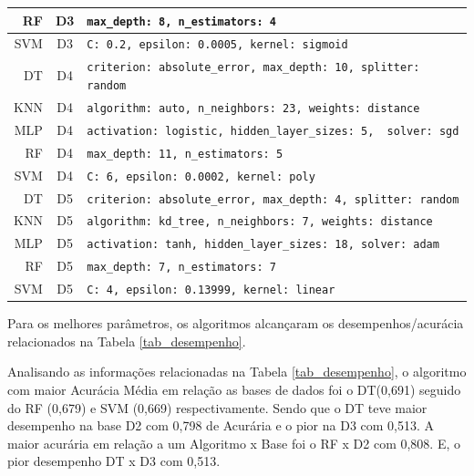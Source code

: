\documentclass[12pt]{article}
\begin{document}
\begin{table}[h!]
\begin{center}
\begin{tabular}{r|c|l}
      RF                  & D3                     & \scriptsize{\verb=max_depth: 8, n_estimators: 4=} \\ \hline
      SVM                 & D3                     & \scriptsize{\verb=C: 0.2, epsilon: 0.0005, kernel: sigmoid=} \\ \hline
      DT                  & D4                     & \scriptsize{\verb=criterion: absolute_error, max_depth: 10, splitter: random=} \\ \hline
      KNN                 & D4                     & \scriptsize{\verb=algorithm: auto, n_neighbors: 23, weights: distance=} \\ \hline
      MLP                 & D4                     & \scriptsize{\verb=activation: logistic, hidden_layer_sizes: 5,  solver: sgd=} \\ \hline
      RF                  & D4                     & \scriptsize{\verb=max_depth: 11, n_estimators: 5=} \\ \hline
      SVM                 & D4                     & \scriptsize{\verb=C: 6, epsilon: 0.0002, kernel: poly=} \\ \hline
      DT                  & D5                     & \scriptsize{\verb=criterion: absolute_error, max_depth: 4, splitter: random=} \\ \hline
      KNN                 & D5                     & \scriptsize{\verb=algorithm: kd_tree, n_neighbors: 7, weights: distance=} \\ \hline
      MLP                 & D5                     & \scriptsize{\verb=activation: tanh, hidden_layer_sizes: 18, solver: adam=} \\ \hline
      RF                  & D5                     & \scriptsize{\verb=max_depth: 7, n_estimators: 7=} \\ \hline
      SVM                 & D5                     & \scriptsize{\verb=C: 4, epsilon: 0.13999, kernel: linear=} \\ \hline
    \end{tabular}
  \end{center}
\end{table}

Para os melhores parâmetros, os algoritmos alcançaram os desempenhos/acurácia relacionados na Tabela \ref{tab_desempenho}.

Analisando as informações relacionadas na Tabela \ref{tab_desempenho}, o algoritmo com maior Acurácia Média em relação as bases de dados foi o DT(0,691) seguido do RF (0,679) e SVM (0,669) respectivamente. Sendo que o DT teve maior desempenho na base D2 com 0,798 de Acurária e o pior na D3 com 0,513. A maior acurária em relação a um Algoritmo x Base foi o RF x D2 com 0,808. E, o pior desempenho DT x D3 com 0,513.  
\end{document}
